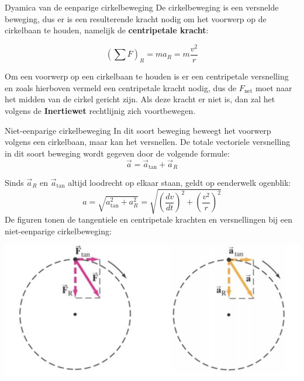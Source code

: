 \newpage

\begin{theo}{Dyamica van de eenparige cirkelbeweging}
    De cirkelbeweging is een versnelde beweging, dus er is een resulterende kracht nodig om het voorwerp op de cirkelbaan te houden, namelijk de \textbf{centripetale kracht}:

    \begin{equation*}
        \left(\sum F\right)_R = ma_R = m\frac{v^2}{r}
    \end{equation*}
    
    \noindent Om een voorwerp op een cirkelbaan te houden is er een centripetale versnelling en zoals hierboven vermeld een centripetale kracht nodig, dus de $ F_{\text{net}} $ moet naar het midden van de cirkel gericht zijn. Als deze kracht er niet is, dan zal het volgens de \textbf{Inertiewet} rechtlijnig zich voortbewegen.
\end{theo}
 
\begin{theo}{Niet-eenparige cirkelbeweging}
    In dit soort beweging beweegt het voorwerp volgens een cirkelbaan, maar kan het versnellen. De totale vectoriele versnelling in dit soort beweging wordt gegeven door de volgende formule:
    \begin{equation*}
        \Vec{a} = \Vec{a}_{\text{tan}} + \Vec{a}_R 
    \end{equation*}

    \noindent Sinds $ \Vec{a}_R $ en $ \Vec{a}_{\text{tan}} $ altijd loodrecht op elkaar staan, geldt op eenderwelk ogenblik:
    \begin{equation*}
        a = \sqrt{a_{\text{tan}}^2 + a_R^2} = \sqrt{\left(\frac{dv}{dt}\right)^2 + \left(\frac{v^2}{r}\right)^2}
    \end{equation*}
    \noindent De figuren tonen de tangentiele en centripetale krachten en versnellingen bij een niet-eenparige cirkelbeweging:
    
        \begin{center}
            \includegraphics[scale = 0.23]{Images/Dynamica/Niet-Eenparige Cirkelbeweging.png} 
        \end{center}
\end{theo}

